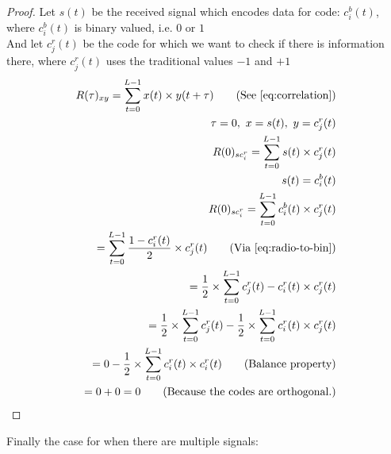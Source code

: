 		\begin{proof}
			Let $s(t)$ be the received signal which encodes data for code: $c^b_i(t)$, where $c^b_i(t)$ is binary valued, i.e. $0$ or $1$ \\
			And let $c^r_j(t)$ be the code for which we want to check if there is information there, where $c^r_j(t)$ uses the traditional values $-1$ and $+1$ \\

			\begin{align*}
				R(\tau)_{xy} = \displaystyle\sum_{t = 0} ^ {L - 1} x(t) \times y(t + \tau)	\tag{See \autoref{eq:correlation}}
				\\ \tau = 0,\ x = s(t),\ y = c^r_j(t)	
				\\ R(0)_{sc^r_{i}} = \displaystyle\sum_{t = 0} ^ {L - 1} s(t) \times c^r_j(t)	
				\\ s(t) = c^b_i(t)										
				\\ R(0)_{sc^r_{i}} = \displaystyle\sum_{t = 0} ^ {L - 1} c^b_i(t) \times c^r_j(t)
				\\ = \displaystyle\sum_{t = 0} ^ {L - 1} \frac{1 - c^r_i(t)}{2} \times c^r_j(t) \tag{Via \autoref{eq:radio-to-bin}}
				\\ = \frac{1}{2} \times \displaystyle\sum_{t = 0} ^ {L - 1} c^r_j(t) - c^r_i(t) \times c^r_j(t)
				\\ = \frac{1}{2} \times \displaystyle\sum_{t = 0} ^ {L - 1} c^r_j(t) - \frac{1}{2} \times \displaystyle\sum_{t = 0} ^ {L - 1} c^r_i(t) \times c^r_j(t)
				\\ = 0 - \frac{1}{2} \times \displaystyle\sum_{t = 0} ^ {L - 1} c^r_i(t) \times c^r_i(t) \tag{Balance property}
				\\ = 0 + 0 = 0\tag{Because the codes are orthogonal.}
			\end{align*}

		\end{proof}

		Finally the case for when there are multiple signals:


